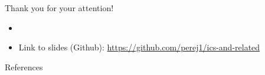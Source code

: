 \documentclass[11pt, aspectratio=169]{beamer}
\begin{document}

\begin{frame}
  Thank you for your attention!
  \begin{itemize}
    \item[]
    \item Link to slides (Github):
    \textcolor{hyscience}{\url{https://github.com/perej1/ics-and-related}}
  \end{itemize}
\end{frame}


\begin{frame}[allowframebreaks]{References}
  \printbibliography
\end{frame}
\end{document}
